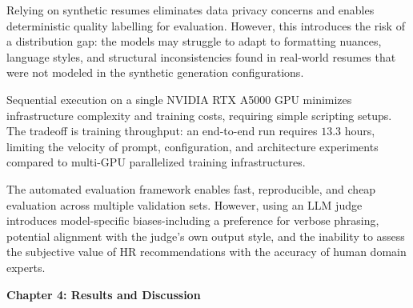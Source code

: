 \documentclass[12pt, a4paper]{report}
\begin{document}
\vspace{0.6cm}
\vspace{0.4cm}

\vspace{0.3cm}

Relying on synthetic resumes eliminates data privacy concerns and enables deterministic quality labelling for evaluation. However, this introduces the risk of a distribution gap: the models may struggle to adapt to formatting nuances, language styles, and structural inconsistencies found in real-world resumes that were not modeled in the synthetic generation configurations.

\vspace{0.3cm}

Sequential execution on a single NVIDIA RTX A5000 GPU minimizes infrastructure complexity and training costs, requiring simple scripting setups. The tradeoff is training throughput: an end-to-end run requires $13.3$ hours, limiting the velocity of prompt, configuration, and architecture experiments compared to multi-GPU parallelized training infrastructures.

\vspace{0.3cm}

The automated evaluation framework enables fast, reproducible, and cheap evaluation across multiple validation sets. However, using an LLM judge introduces model-specific biases-including a preference for verbose phrasing, potential alignment with the judge's own output style, and the inability to assess the subjective value of HR recommendations with the accuracy of human domain experts.

\newpage
\begin{center}
    {\Huge \textbf{Chapter 4: Results and Discussion}\par}
\end{center}
\vspace{1cm}

\vspace{0.8cm}
\vspace{0.4cm}
\end{document}
